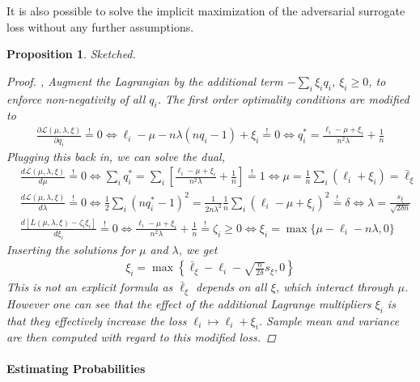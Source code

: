 \documentclass{article}
\newtheorem{proposition}{Proposition}
\begin{document}
It is also possible to solve the implicit maximization of the adversarial surrogate loss without any further assumptions. 
\begin{proposition}
Sketched.
\begin{proof},
Augment the Lagrangian by the additional term $-\sum_{i} \xi_i q_i$, $\xi_i \ge 0$, to enforce non-negativity of all $q_i$. The first order optimality conditions are modified to 
\begin{align}
\frac{\partial \mathcal L(\mu, \lambda,\xi)}{\partial q_i} \stackrel !=0 \iff \ell_i - \mu  - n \lambda (n q_i -1) + \xi_i  \stackrel != 0 \iff q_i^*  = \frac{\ell_i - \mu + \xi_i} {n^2 \lambda} + \frac 1n
\end{align}
Plugging this back in, we can solve the dual, 
\begin{align*}
& \frac{d \mathcal L (\mu,\lambda,\xi)}{d\mu} \stackrel !=0 \iff 
\sum_i q_i^* = \sum_i \left[ \frac{\ell_i - \mu+ \xi_i} {n^2 \lambda} + \frac 1n \right] \stackrel !=1 \iff \mu =
\frac 1n \sum_i (\ell_i + \xi_i) = \bar \ell_\xi\\
& \frac{d \mathcal L (\mu,\lambda,\xi)}{d\lambda} \stackrel !=0 \iff 
\frac 12 \sum_i (nq_i^*-1)^2 = \frac 1{2n\lambda^2} \frac 1n \sum_i \left( \ell_i -\mu + \xi_i\right)^2 \stackrel !=\delta
\iff \lambda = \frac {s_\xi}{\sqrt{2 \delta n}}\\
& \frac{d [  L (\mu,\lambda,\xi) - \zeta_i \xi_i] }{d\xi_i} \stackrel !=0 \iff 
\frac{\ell_i - \mu + \xi_i} {n^2 \lambda} + \frac 1n \stackrel != \zeta_i \geq 0
\iff \xi_i = \max\{ \mu - \ell_i - n \lambda, 0\}
\end{align*}
Inserting the solutions for $\mu$ and $\lambda$, we get 
\begin{align}
\xi_i = \max\left\{ \bar\ell_\xi - \ell_i -  \sqrt{\frac{n}{2 \delta}} s_\xi, 0\right\}
\end{align}
This is not an explicit formula as $\bar \ell_\xi$ depends on all $\xi$, which interact through  $\mu$. 
However one can see that the effect of the additional Lagrange multipliers $\xi_i$ is that they effectively increase the loss $\ell_i \mapsto \ell_i + \xi_i$.  Sample mean and variance are then computed with regard to this modified loss. 
\end{proof}
\end{proposition}

\paragraph{Estimating Probabilities}
\end{document}
